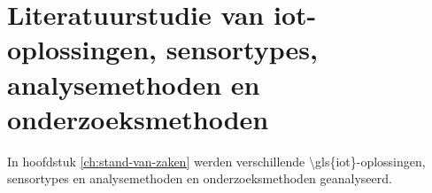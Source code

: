 






\section{Literatuurstudie van \gls{iot}-oplossingen, sensortypes, analysemethoden en onderzoeksmethoden}
In hoofdstuk \ref{ch:stand-van-zaken} werden verschillende \gls{\gls{iot}}-oplossingen, sensortypes en analysemethoden en onderzoeksmethoden geanalyseerd.

